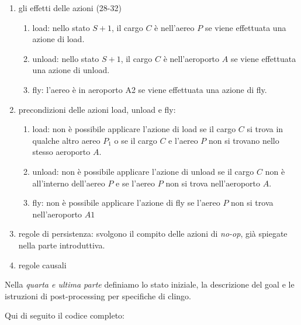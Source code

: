 \begin{enumerate}
\item gli effetti delle azioni (28-32)
\begin{enumerate}
\item load: nello stato $S+1$, il cargo $C$ è nell'aereo $P$ se viene effettuata una azione di load.
\item unload: nello stato $S+1$, il cargo $C$ è nell'aeroporto $A$ se viene effettuata una azione di unload.
\item fly: l'aereo è in aeroporto A2 se viene effettuata una azione di fly.
\end{enumerate}

\item precondizioni delle azioni load, unload e fly:
\begin{enumerate}
\item load: non è possibile applicare l'azione di load se il cargo $C$ si trova in qualche altro aereo $P_1$ o se il cargo $C$ e l'aereo $P$ non si trovano nello stesso aeroporto $A$.
\item unload: non è possibile applicare l'azione di unload se il cargo $C$ non è all'interno dell'aereo $P$ e se l'aereo $P$ non si trova nell'aeroporto $A$.
\item fly: non è possibile applicare l'azione di fly se l'aereo $P$ non si trova nell'aeroporto $A1$
\end{enumerate}

\item regole di persistenza: svolgono il compito delle azioni di \emph{no-op}, già spiegate nella parte introduttiva.

\item regole causali

\end{enumerate}

Nella \emph{quarta e ultima parte} definiamo lo stato iniziale, la descrizione del goal e le istruzioni di post-processing per specifiche di clingo.

Qui di seguito il codice completo:

